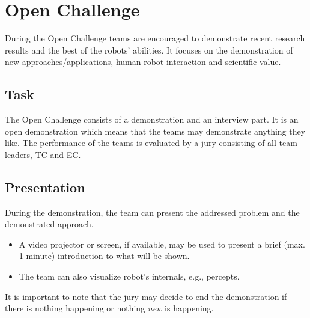 \newcommand{\bonusRobotCoop}{50~}

\section{Open Challenge}
\label{sec:test_open_challenge}

During the Open Challenge teams are encouraged to demonstrate recent research results and the best of the robots' abilities. It focuses on the demonstration of new approaches/applications, human-robot interaction and scientific value.

\subsection{Task}

The Open Challenge consists of a demonstration and an interview part. 
It is an open demonstration which means that the teams may demonstrate anything they like.  
The performance of the teams is evaluated by a jury consisting of all team leaders, TC and EC.

\subsection{Presentation} 
During the demonstration, the team can present the addressed problem and the demonstrated approach.
\begin{itemize}
\item A video projector or screen, if available, may be used to present a brief (max. 1 minute) introduction to what will be shown. 
\item The team can also visualize robot's internals, e.g., percepts. 
\end{itemize}

It is important to note that the jury may decide to end the demonstration if there is nothing happening or nothing \emph{new} is happening.

\OpenDemonstrationChanges

